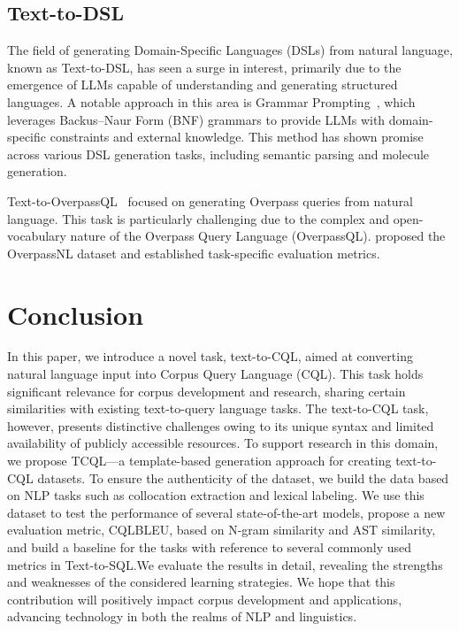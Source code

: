 \documentclass[11pt]{article}
\begin{document}
\begin{CJK*}{UTF8}{gbsn}
\subsection{Text-to-DSL}
\label{sec:text2dsl}

The field of generating Domain-Specific Languages (DSLs) from natural language, known as Text-to-DSL, has seen a surge in interest, primarily due to the emergence of LLMs capable of understanding and generating structured languages. 
A notable approach in this area is Grammar Prompting~\citep{wang2023grammar}, which leverages Backus–Naur Form (BNF) grammars to provide LLMs with domain-specific constraints and external knowledge. 
This method has shown promise across various DSL generation tasks, including semantic parsing and molecule generation.

Text-to-OverpassQL~\citep{staniek2023texttooverpassql} focused on generating Overpass queries from natural language. 
This task is particularly challenging due to the complex and open-vocabulary nature of the Overpass Query Language (OverpassQL). 
\citet{staniek2023texttooverpassql} proposed the OverpassNL dataset and established task-specific evaluation metrics.

\section{Conclusion}

In this paper, we introduce a novel task, text-to-CQL, aimed at converting natural language input into Corpus Query Language (CQL). This task holds significant relevance for corpus development and research, sharing certain similarities with existing text-to-query language tasks. The text-to-CQL task, however, presents distinctive challenges owing to its unique syntax and limited availability of publicly accessible resources. To support research in this domain, we propose TCQL—a template-based generation approach for creating text-to-CQL datasets. To ensure the authenticity of the dataset, we build the data based on NLP tasks such as collocation extraction and lexical labeling. We use this dataset to test the performance of several state-of-the-art models, propose a new evaluation metric, CQLBLEU, based on N-gram similarity and AST similarity, and build a baseline for the tasks with reference to several commonly used metrics in Text-to-SQL.We evaluate the results in detail, revealing the strengths and weaknesses of the considered learning strategies. We hope that this contribution will positively impact corpus development and applications, advancing technology in both the realms of NLP and linguistics.




\end{CJK*}
\end{document}
